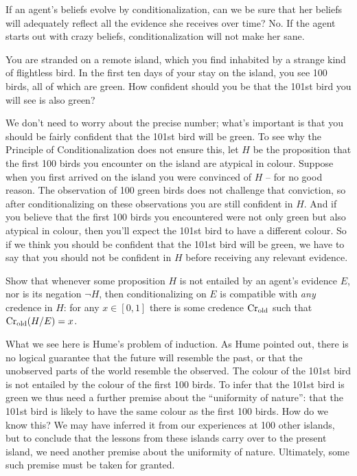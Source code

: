 If an agent's beliefs evolve by conditionalization, can we be sure
that her beliefs will adequately reflect all the evidence she receives
over time? No. If the agent starts out with crazy beliefs,
conditionalization will not make her sane.

\begin{example}\label{ex:grue}
  You are stranded on a remote island, which you find inhabited by a
  strange kind of flightless bird. In the first ten days of your stay
  on the island, you see 100 birds, all of which are green. How
  confident should you be that the 101st bird you will see is also
  green?
\end{example}

We don't need to worry about the precise number; what's important is
that you should be fairly confident that the 101st bird will be
green. To see why the Principle of Conditionalization does not ensure
this, let $H$ be the proposition that the first 100 birds you
encounter on the island are atypical in colour. Suppose when you first
arrived on the island you were convinced of $H$ -- for no good
reason. The observation of 100 green birds does not challenge that
conviction, so after conditionalizing on these observations you are
still confident in $H$. And if you believe that the first 100 birds
you encountered were not only green but also atypical in colour, then
you'll expect the 101st bird to have a different colour. So if we
think you should be confident that the 101st bird will be green, we
have to say that you should not be confident in $H$ before receiving
any relevant evidence.


\begin{exercise}
  Show that whenever some proposition $H$ is not entailed by an
  agent's evidence $E$, nor is its negation $\neg H$, then
  conditionalizing on $E$ is compatible with \emph{any} credence in $H$:
  for any $x \in [0,1]$ there is some credence $\text{Cr}_\text{old}$ such
  that $\text{Cr}_\text{old}(H/E) = x$.
\end{exercise}

What we see here is Hume's problem of induction. As Hume pointed out,
there is no logical guarantee that the future will resemble the past,
or that the unobserved parts of the world resemble the
observed. The colour of the 101st bird is not entailed by the colour
of the first 100 birds. To infer that the 101st bird is green we thus
need a further premise about the ``uniformity of nature'': that the
101st bird is likely to have the same colour as the first 100
birds. How do we know this? We may have inferred it from our
experiences at 100 other islands, but to conclude that the lessons
from these islands carry over to the present island, we need another
premise about the uniformity of nature. Ultimately, some such premise
must be taken for granted.

